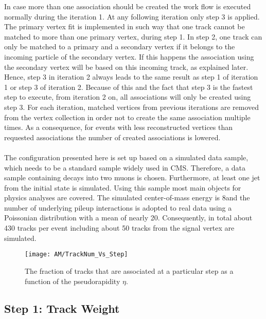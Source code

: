 In case more than one association should be created the work flow is executed normally during the iteration 1. At any following iteration only step 3 is applied. The primary vertex fit is implemented in such way that one track cannot be matched to more than one primary vertex, during step 1. In step 2, one track can only be matched to a primary and a secondary vertex if it belongs to the incoming particle of the secondary vertex. If this happens the association using the secondary vertex will be based on this incoming track, as explained later. Hence, step 3 in iteration 2 always leads to the same result as step 1 of iteration 1 or  step 3 of iteration 2. Because of this and the fact that step 3 is the fastest step to execute, from iteration 2 on, all associations will only be created using step 3. For each iteration, matched vertices from previous iterations are removed from the vertex collection in order not to create the same association multiple times. As a consequence, for events with less reconstructed vertices than requested associations the number of created associations is lowered. \\ \\
The configuration presented here is set up based on a simulated data sample, which needs to be a standard sample widely used in CMS. Therefore, a data sample containing \Zz decays into two muons is chosen. Furthermore, at least one jet from the initial state is simulated. Using this sample most main objects for physics analyses are covered. The simulated center-of-mass energy is 8\TeV and the number of underlying pileup interactions is adopted to real data using a Poissonian distribution with a mean of nearly 20. Consequently, in total about 430 tracks per event including about 50 tracks from the signal vertex are simulated.

\begin{figure}[Ht]
    \centering
    \texttt{[image: AM/TrackNum\_Vs\_Step]}
    \caption[Plot of the fraction of tracks to be associated at which step]{The fraction of tracks that are associated at a particular step as a function of the pseudorapidity $\eta{}$.\label{plot:AMTrackStepFrac}}
\end{figure}

\subsection{Step 1: Track Weight \label{sec:AMWFTW}}

